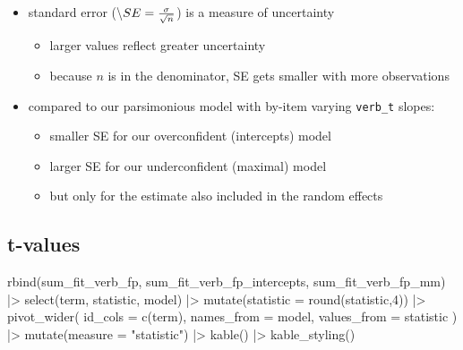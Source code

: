 \documentclass[
  letterpaper,
  DIV=11,
  numbers=noendperiod]{scrartcl}
\newenvironment{Shaded}{\begin{snugshade}}{\end{snugshade}}
\newcommand{\AttributeTok}[1]{\textcolor[rgb]{0.40,0.45,0.13}{#1}}
\newcommand{\DecValTok}[1]{\textcolor[rgb]{0.68,0.00,0.00}{#1}}
\newcommand{\FunctionTok}[1]{\textcolor[rgb]{0.28,0.35,0.67}{#1}}
\newcommand{\NormalTok}[1]{\textcolor[rgb]{0.00,0.23,0.31}{#1}}
\newcommand{\SpecialCharTok}[1]{\textcolor[rgb]{0.37,0.37,0.37}{#1}}
\newcommand{\StringTok}[1]{\textcolor[rgb]{0.13,0.47,0.30}{#1}}
\providecommand{\tightlist}{%
  \setlength{\itemsep}{0pt}\setlength{\parskip}{0pt}}\usepackage{longtable,booktabs,array}
\begin{document}
\begin{itemize}
\tightlist
\item
  standard error (\textbackslash{}\(SE = \frac{\sigma}{\sqrt{n}}\\\)) is
  a measure of uncertainty

  \begin{itemize}
  \tightlist
  \item
    larger values reflect greater uncertainty
  \item
    because \(n\) is in the denominator, SE gets smaller with more
    observations
  \end{itemize}
\item
  compared to our parsimonious model with by-item varying
  \texttt{verb\_t} slopes:

  \begin{itemize}
  \tightlist
  \item
    smaller SE for our overconfident (intercepts) model
  \item
    larger SE for our underconfident (maximal) model
  \item
    but only for the estimate also included in the random effects
  \end{itemize}
\end{itemize}

\hypertarget{t-values}{%
\subsection{t-values}\label{t-values}}

\begin{Shaded}
\begin{Highlighting}[]
\FunctionTok{rbind}\NormalTok{(sum\_fit\_verb\_fp, sum\_fit\_verb\_fp\_intercepts, sum\_fit\_verb\_fp\_mm) }\SpecialCharTok{|\textgreater{}} 
  \FunctionTok{select}\NormalTok{(term, statistic, model) }\SpecialCharTok{|\textgreater{}}
  \FunctionTok{mutate}\NormalTok{(}\AttributeTok{statistic =} \FunctionTok{round}\NormalTok{(statistic,}\DecValTok{4}\NormalTok{)) }\SpecialCharTok{|\textgreater{}} 
  \FunctionTok{pivot\_wider}\NormalTok{(}
    \AttributeTok{id\_cols =} \FunctionTok{c}\NormalTok{(term),}
    \AttributeTok{names\_from =}\NormalTok{ model,}
    \AttributeTok{values\_from =}\NormalTok{ statistic}
\NormalTok{  ) }\SpecialCharTok{|\textgreater{}} 
  \FunctionTok{mutate}\NormalTok{(}\AttributeTok{measure =} \StringTok{"statistic"}\NormalTok{) }\SpecialCharTok{|\textgreater{}} 
  \FunctionTok{kable}\NormalTok{() }\SpecialCharTok{|\textgreater{}} 
  \FunctionTok{kable\_styling}\NormalTok{()}
\end{Highlighting}
\end{Shaded}
\end{document}
